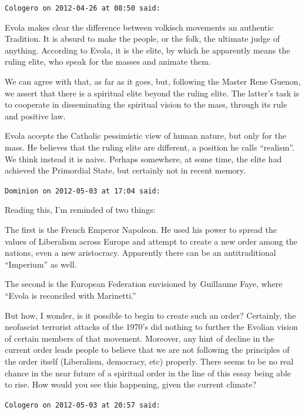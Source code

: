 \begin{footnotesize}
\begin{sffamily}
\texttt{Cologero on 2012-04-26 at 08:50 said:}

Evola makes clear the difference between volkisch movements an authentic Tradition. It is absurd to make the people, or the folk, the ultimate judge of anything. According to Evola, it is the elite, by which he apparently means the ruling elite, who speak for the masses and animate them.

We can agree with that, as far as it goes, but, following the Master Rene Guenon, we assert that there is a spiritual elite beyond the ruling elite. The latter's task is to cooperate in disseminating the spiritual vision to the mass, through its rule and positive law.

Evola accepts the Catholic pessimistic view of human nature, but only for the mass. He believes that the ruling elite are different, a position he calls ``realism''. We think instead it is naive. Perhaps somewhere, at some time, the elite had achieved the Primordial State, but certainly not in recent memory.

\hfill

\texttt{Dominion on 2012-05-03 at 17:04 said:}

Reading this, I'm reminded of two things:

The first is the French Emperor Napoleon. He used his power to spread the values of Liberalism across Europe and attempt to create a new order among the nations, even a new aristocracy. Apparently there can be an antitraditional ``Imperium'' as well.

The second is the European Federation envisioned by Guillaume Faye, where ``Evola is reconciled with Marinetti.''

But how, I wonder, is it possible to begin to create such an order? Certainly, the neofascist terrorist attacks of the 1970's did nothing to further the Evolian vision of certain members of that movement. Moreover, any hint of decline in the current order leads people to believe that we are not following the principles of the order itself (Liberalism, democracy, etc) properly. There seems to be no real chance in the near future of a spiritual order in the line of this essay being able to rise. How would you see this happening, given the current climate?

\hfill

\texttt{Cologero on 2012-05-03 at 20:57 said:}


\end{sffamily}
\end{footnotesize}
